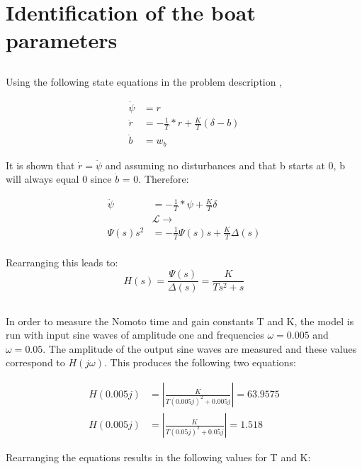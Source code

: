\section{Identification of the boat parameters}
\subsection{}
Using the following state equations in the problem description ,

\begin{align*}
    \dot{\psi} &= r \\
    \dot{r} &= -\frac{1}{T}*r + \frac{K}{T}(\delta - b) \\
    \dot{b} &= w_b
\end{align*}

It is shown that $\dot{r} = \ddot{\psi}$ and assuming no disturbances and that b starts at 0, b will always equal 0 since $\dot{b}$ = 0. Therefore:

\begin{align*}
    \ddot{\psi} &= -\frac{1}{T}*\psi + \frac{K}{T}\delta \\
    &\mathcal{L}\rightarrow  \\
    \Psi(s)s^2  &= -\frac{1}{T}\Psi(s)s + \frac{K}{T}\Delta(s) \\
\end{align*}

Rearranging this leads to:
\begin{equation}
    H(s) = \frac{\Psi(s)}{\Delta(s)} = \frac{K}{Ts^2 + s}
\end{equation}

\subsection{}
In order to measure the Nomoto time and gain constants T and K, the model is run with input sine waves of amplitude one and frequencies $\omega = 0.005$ and $\omega = 0.05$. The amplitude of the output sine waves are measured and these values correspond to $H(j\omega)$. This produces the following two equations:

\begin{align*}
    H(0.005j) &= \left|\frac{K}{T(0.005j)^2 + 0.005j}\right| = 63.9575 \\
    H(0.005j) &= \left|\frac{K}{T(0.05j)^2 + 0.05j}\right| = 1.518
\end{align*}

Rearranging the equations results in the following values for T and K:


